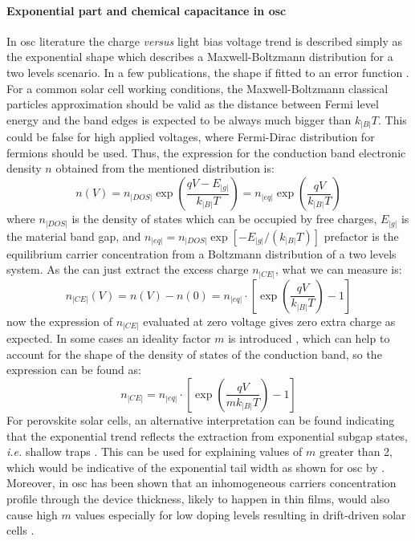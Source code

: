 		\paragraph{Exponential part and chemical capacitance in \gls{osc}}\label{ce_exp_osc}
		In \gls{osc} literature the charge \textsl{versus} light bias voltage trend is described simply as the exponential shape which describes a Maxwell\hyp{}Boltzmann distribution for a two levels scenario.
		In a few publications, the shape if fitted to an error function \cite{Ajuria2011}.
		For a common solar cell working conditions, the Maxwell\hyp{}Boltzmann classical particles approximation should be valid as the distance between Fermi level energy and the band edges is expected to be always much bigger than $k_|B|T$.
		This could be false for high applied voltages, where Fermi\hyp{}Dirac distribution for fermions should be used.
		Thus, the expression for the conduction band electronic density $n$ obtained from the mentioned distribution is:
		\begin{equation}
			n(V) = n_|DOS| \exp(\frac{qV - E_|g|}{k_|B|T}) = n_|eq| \exp(\frac{qV}{k_|B|T})
		\end{equation}
		where $n_|DOS|$ is the density of states which can be occupied by free charges, $E_|g|$ is the material band gap, and $n_|eq|=n_|DOS|\exp[-E_|g|/(k_|B|T)]$ prefactor is the equilibrium carrier concentration from a Boltzmann distribution of a two levels system. %
		As the  can just extract the excess charge $n_|CE|$, what we can measure is:
		\begin{equation}
			n_|CE|(V) = n(V)-n(0) = n_|eq| \cdot \left[\exp(\frac{qV}{k_|B|T})-1\right]
		\end{equation}
		now the expression of $n_|CE|$ evaluated at zero voltage gives zero extra charge as expected.
		In some cases an ideality factor $m$ is introduced \cite{Kirchartz2012}, which can help to account for the shape of the density of states of the conduction band, so the expression can be found as:
		\begin{equation}\label{eq:ce_osc}
			n_|CE| = n_|eq| \cdot \left[\exp(\frac{qV}{mk_|B|T})-1\right]
		\end{equation}
		For perovskite solar cells, an alternative interpretation can be found indicating that the exponential trend reflects the extraction from exponential subgap states, \textsl{i.e.} shallow traps \cite{Du2018}.
		This can be used for explaining values of $m$ greater than 2, which would be indicative of the exponential tail width as shown for \gls{osc} by .
		Moreover, in \gls{osc} has been shown that an inhomogeneous carriers concentration profile through the device thickness, likely to happen in thin films, would also cause high $m$ values \cite{Kirchartz2012} especially for low doping levels resulting in drift\hyp{}driven solar cells \cite{Deledalle2015,Deledalle2014}.


